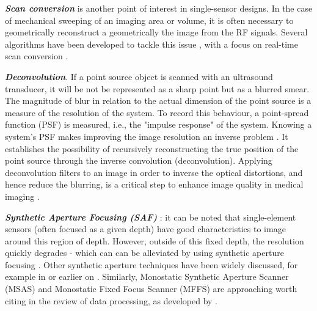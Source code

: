 \documentclass{article}
\begin{document}
\textbf{\textit{Scan conversion}} is another point of interest in single-sensor designs. In the case of mechanical sweeping of an imaging area or volume, it is often necessary to geometrically reconstruct a geometrically the image from the RF signals. Several algorithms have been developed to tackle this issue \cite{ophir_digital_1979}, with a focus on real-time scan conversion  \cite{csany_real-time_2019}.

\textbf{\textit{Deconvolution}}. If a point source object is scanned with an ultrasound transducer, it will be not be represented as a sharp point but as a blurred smear. The magnitude of blur in relation to the actual dimension of the point source is a measure of the resolution of the system. To record this behaviour, a point-spread function (PSF) is measured, i.e., the "impulse response" of the system.  Knowing a system’s PSF makes improving the image resolution an inverse problem  \cite{jensen_deconvolution_1993,dalitz_point_2015}. It establishes the possibility of recursively reconstructing the true position of the point source through the inverse convolution (deconvolution). Applying deconvolution filters to an image in order to inverse the optical distortions, and hence reduce the blurring, is a critical step to enhance image quality in medical imaging \cite{dalitz_point_2015}.

\textbf{\textit{Synthetic Aperture Focusing (SAF)}} : it can be noted that single-element sensors (often focused as a given depth) have good characteristics to image around this region of depth. However, outside of this fixed depth, the resolution quickly degrades - which can can be alleviated by using synthetic aperture focusing \cite{andresen_synthetic_2011, assef_flexible_2015, li_initial_2018, lewandowski_low-cost_2012, zhang_synthetic_2016}. Other synthetic aperture techniques have been widely discussed, for example in \cite{gunarathne_strategies_2013, jeon_novel_2019} or earlier on \cite{burckhardt_experimental_1974}. Similarly, Monostatic Synthetic Aperture Scanner (MSAS) and Monostatic Fixed Focus Scanner (MFFS) are approaching worth citing in the review of data processing, as developed by \cite{bottenus_implementation_2015, ylitalo_ultrasound_1994,heuvel_development_2017, nikolov_fast_2008}.  
\end{document}
